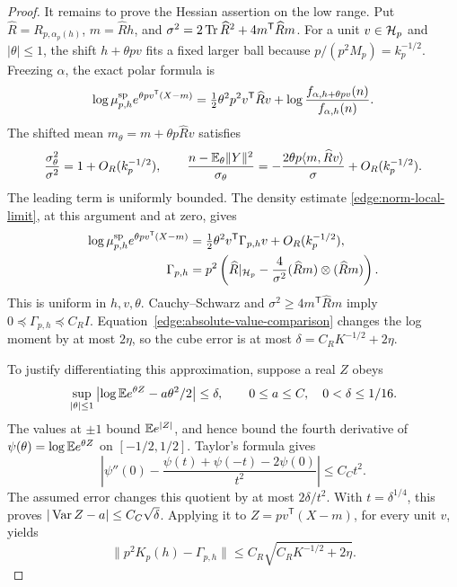 \begin{proof}
It remains to prove the Hessian assertion on the low range.  Put
\(\widehat R=R_{p,\alpha_p(h)}\), \(m=\widehat Rh\), and
\(\sigma^2=2\operatorname{Tr}\widehat R^2+4m^{\mathsf T}\widehat Rm\).  For a unit \(v\in\mathcal H_p\)
and \(|\theta|\le1\), the shift \(h+\theta pv\) fits a fixed larger
ball because \(p/(p^2M_p)=k_p^{-1/2}\).  Freezing \(\alpha\), the
exact polar formula is
\[
 \log\mu_{p,h}^{\rm sp} e^{\theta p v^{\mathsf T}(X-m)}
 =\tfrac12\theta^2p^2v^{\mathsf T}\widehat Rv+
       \log\frac{f_{\alpha,h+\theta pv}(n)}{f_{\alpha,h}(n)}.
\]
The shifted mean \(m_\theta=m+\theta p\widehat Rv\) satisfies
\[
 \frac{\sigma_\theta^2}{\sigma^2}=1+O_R(k_p^{-1/2}),\qquad
 \frac{n-\mathbb E_\theta\|Y\|^2}{\sigma_\theta}
       =-\frac{2\theta p\langle m,\widehat Rv\rangle}{\sigma}
           +O_R(k_p^{-1/2}).
\]
The leading term is uniformly bounded.  The density estimate
\eqref{edge:norm-local-limit}, at this argument and at zero, gives
\begin{equation}\label{edge:frozen-mgf-curvature}
 \begin{split}
 \log\mu_{p,h}^{\rm sp} e^{\theta p v^{\mathsf T}(X-m)}
   &=\tfrac12\theta^2v^{\mathsf T}\Gamma_{p,h}v+O_R(k_p^{-1/2}),\\
 \Gamma_{p,h}
   &=p^2\left(\widehat R|_{\mathcal H_p}
       -\frac4{\sigma^2}(\widehat Rm)\otimes(\widehat Rm)\right).
 \end{split}
\end{equation}
This is uniform in \(h,v,\theta\).
Cauchy--Schwarz and \(\sigma^2\ge4m^{\mathsf T}\widehat Rm\) imply
\(0\preceq\Gamma_{p,h}\preceq C_RI\).
Equation~\eqref{edge:absolute-value-comparison} changes the log moment
by at most \(2\eta\), so the cube error is at most
\(\delta=C_RK^{-1/2}+2\eta\).

To justify differentiating this approximation, suppose a real \(Z\) obeys
\[
 \sup_{|\theta|\le1}
 \left|\log\mathbb E e^{\theta Z}-a\theta^2/2\right|\le\delta,\qquad
 0\le a\le C,\quad 0<\delta\le1/16.
\]
The values at \(\pm1\) bound \(\mathbb E e^{|Z|}\), and hence bound the
fourth derivative of \(\psi(\theta)=\log\mathbb E e^{\theta Z}\) on
\([-1/2,1/2]\).  Taylor's formula gives
\[
 \left|\psi''(0)
       -\frac{\psi(t)+\psi(-t)-2\psi(0)}{t^2}\right|\le C_Ct^2.
\]
The assumed error changes this quotient by at most \(2\delta/t^2\).
With \(t=\delta^{1/4}\), this proves
\(|\operatorname{Var} Z-a|\le C_C\sqrt\delta\).  Applying it to
\(Z=pv^{\mathsf T}(X-m)\), for every unit \(v\), yields
\begin{equation}\label{edge:hessian-approximation}
 \|p^2K_p(h)-\Gamma_{p,h}\|
       \le C_R\sqrt{C_RK^{-1/2}+2\eta}.
\end{equation}


\end{proof}
